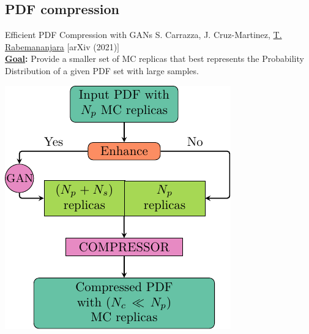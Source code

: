 \providecommand{\iRef}[1]{{\tiny\color{HallowGreen} $[$#1$]$}}

\author[Tanjona Rabemananjara]{}

\subsection{PDF compression}

\begin{frame}{Efficient PDF Compression with GANs}
	S. Carrazza, J. Cruz-Martinez, \underline{T. Rabemananjara} \iRef{arXiv (2021)} \\
	\textbf{\textcolor{HallowGreen}{\underline{Goal}:}} Provide a smaller set of MC 
	replicas that best represents the Probability Distribution of a given PDF set 
	with large samples.
	\vspace*{-0.1cm}	
	\begin{center}
	\includegraphics[height=.7\textheight]{./gan_compressor/imgs/pygans.pdf}
	\end{center}
\end{frame}

